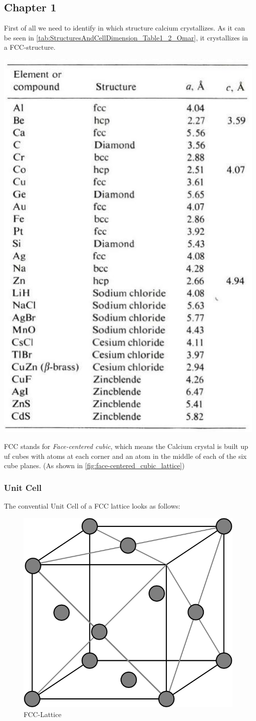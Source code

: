 \subsection{Chapter 1} \label{chap1}

First of all we need to identify in which structure calcium crystallizes.
As it can be seen in \autoref{tab:StructuresAndCellDimension_Table1_2_Omar},
it crystallizes in a FCC-structure.

\begin{table}[H]
	\centering
	\caption{Structures and Cell Dimensions of some Elements and Compounds,\\
	Elementary Solid State Physics \cite{elementary_SSP}, p. 18}
	\includegraphics[width=0.5\linewidth]{Graphics/Chapter1/StructuresAndCellDimension_Table1_2_Omar}
	\label{tab:StructuresAndCellDimension_Table1_2_Omar}
\end{table}

FCC stands for \textit{Face-centered cubic}, which means 
the Calcium crystal is built up uf cubes with atoms at each
corner and an atom in the middle of each of the six cube planes.
(As shown in \autoref{fig:face-centered_cubic_lattice})

\subsubsection*{Unit Cell}
The convential Unit Cell of a FCC lattice looks as follows:

\begin{figure}[H]
	\centering
	\includegraphics[width=0.4\linewidth]{Graphics/Chapter1/face-centered_cubic_lattice.png}
	\caption{FCC-Lattice}
	\label{fig:face-centered_cubic_lattice}
\end{figure}

